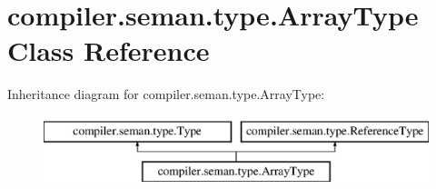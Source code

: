 \hypertarget{classcompiler_1_1seman_1_1type_1_1_array_type}{}\section{compiler.\+seman.\+type.\+Array\+Type Class Reference}
\label{classcompiler_1_1seman_1_1type_1_1_array_type}
Inheritance diagram for compiler.\+seman.\+type.\+Array\+Type\+:\begin{figure}[H]
\begin{center}
\leavevmode
\includegraphics[height=2.000000cm]{classcompiler_1_1seman_1_1type_1_1_array_type}
\end{center}
\end{figure}
